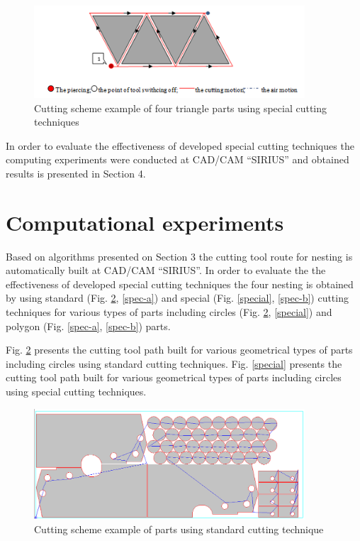 \documentclass[runningheads]{llncs}
\begin{document}
\begin{figure}
  \begin{center}
  \includegraphics[width=0.9\textwidth]{tri.png}
  \caption{Cutting scheme example of four triangle parts using special cutting techniques}
  \label{tri}
  \end{center}
\end{figure}

In order to evaluate the effectiveness
of developed special cutting techniques
the computing experiments were conducted at CAD/CAM ``SIRIUS''
and obtained results is presented in Section 4.

\section{Computational experiments}

Based on algorithms presented on Section 3
the cutting tool route for nesting is automatically built at CAD/CAM ``SIRIUS''.
In order to evaluate the the effectiveness of developed special cutting techniques
the four nesting is obtained by using standard (Fig. \ref{std}, \ref{spec-a})
and special (Fig. \ref{special}, \ref{spec-b})
cutting techniques for various types of parts including circles
(Fig. \ref{std}, \ref{special}) and polygon (Fig. \ref{spec-a}, \ref{spec-b}) parts.

Fig. \ref{std} presents the cutting tool path
built for various geometrical types of parts including circles using standard cutting techniques.
Fig. \ref{special} presents the cutting tool path built for various geometrical types of parts
including circles using special cutting techniques.

\begin{figure}
  \begin{center}
  \includegraphics[width=0.9\textwidth]{std.png}
  \caption{Cutting scheme example of parts using standard cutting technique}
  \label{std}
  \end{center}
\end{figure}
\end{document}
